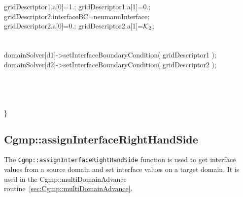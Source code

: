 \begin{flushleft}
\ie           gridDescriptor1.a[0]=1.; gridDescriptor1.a[1]=0.;\\
\ie           gridDescriptor2.interfaceBC=neumannInterface;   \\ 
\ie           gridDescriptor2.a[0]=0.; gridDescriptor2.a[1]=${\mathcal K}_2$;\\
\id        \END\\
\id        {} \\
\id        domainSolver[d1]->setInterfaceBoundaryCondition( gridDescriptor1 ); \\
\id        domainSolver[d2]->setInterfaceBoundaryCondition( gridDescriptor2 ); \\
\ic      \END\\
\ib    \END \\
\ib  \\
\ia  \END \\
\}
\end{flushleft}

\subsection{Cgmp::assignInterfaceRightHandSide} \label{sec:Cgmp::assignInterfaceRightHandSide}

The {\tt Cgmp::assignInterfaceRightHandSide} function is used to get interface values from a source
domain and set interface values on a target domain. 
It is used in the Cgmp::multiDomainAdvance routine~\ref{sec:Cgmp::multiDomainAdvance}.


